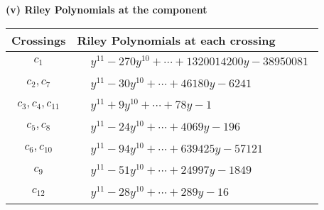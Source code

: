 \documentclass[1p]{elsarticle_modified}
\theoremstyle{definition}
\begin{document}
\flushleft \textbf{(v) Riley Polynomials at the component}\newline \\
\begin{tabular}{m{50pt}|m{274pt}}
Crossings & \hspace{64pt}Riley Polynomials at each crossing \\
\hline $$\begin{aligned}c_{1}\end{aligned}$$&$\begin{aligned}
&y^{11}-270 y^{10}+\cdots+1320014200 y-38950081
\end{aligned}$\\
\hline $$\begin{aligned}c_{2},c_{7}\end{aligned}$$&$\begin{aligned}
&y^{11}-30 y^{10}+\cdots+46180 y-6241
\end{aligned}$\\
\hline $$\begin{aligned}c_{3},c_{4},c_{11}\end{aligned}$$&$\begin{aligned}
&y^{11}+9 y^{10}+\cdots+78 y-1
\end{aligned}$\\
\hline $$\begin{aligned}c_{5},c_{8}\end{aligned}$$&$\begin{aligned}
&y^{11}-24 y^{10}+\cdots+4069 y-196
\end{aligned}$\\
\hline $$\begin{aligned}c_{6},c_{10}\end{aligned}$$&$\begin{aligned}
&y^{11}-94 y^{10}+\cdots+639425 y-57121
\end{aligned}$\\
\hline $$\begin{aligned}c_{9}\end{aligned}$$&$\begin{aligned}
&y^{11}-51 y^{10}+\cdots+24997 y-1849
\end{aligned}$\\
\hline $$\begin{aligned}c_{12}\end{aligned}$$&$\begin{aligned}
&y^{11}-28 y^{10}+\cdots+289 y-16
\end{aligned}$\\
\hline
\end{tabular}\\~\\
\end{document}

